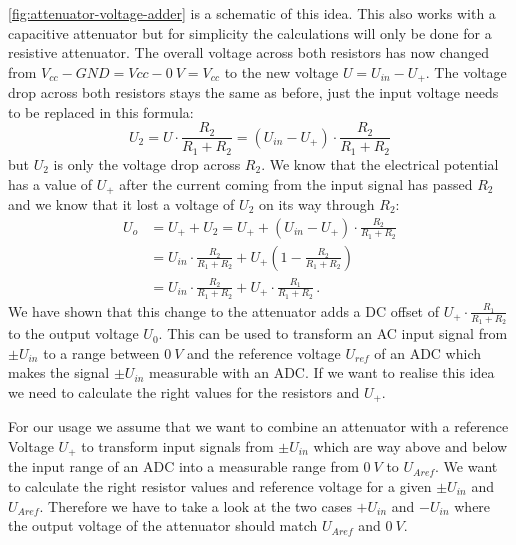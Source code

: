 \cref{fig:attenuator-voltage-adder} is a schematic of this idea. This also works with a capacitive attenuator but for simplicity the calculations will only be done for a resistive attenuator. The overall voltage across both resistors has now changed from $V_{cc} - GND = V{cc} - \SI{0}{V} = V_{cc}$ to the new voltage $U = U_{in} - U_+$. The voltage drop across both resistors stays the same as before, just the input voltage needs to be replaced in this formula:
\begin{equation*}
	U_2 = U \cdot \frac{R_2}{R_1 + R_2} = (U_{in} - U_+) \cdot \frac{R_2}{R_1 + R_2}
\end{equation*}
but $U_2$ is only the voltage drop across $R_2$. We know that the electrical potential has a value of $U_+$ after the current coming from the input signal has passed $R_2$ and we know that it lost a voltage of $U_2$ on its way through $R_2$:
\begin{align*}
	U_o &= U_+ + U_2 = U_+ + (U_{in} - U_+) \cdot \frac{R_2}{R_1 + R_2} \\
		&= U_{in} \cdot \frac{R_2}{R_1 + R_2} + U_+ \left(1 - \frac{R_2}{R_1 + R_2}\right) \\
		&= U_{in} \cdot \frac{R_2}{R_1 + R_2} + U_+ \cdot \frac{R_1}{R_1 + R_2}\,.
\end{align*}
We have shown that this change to the attenuator adds a DC offset of $U_+ \cdot \frac{R_1}{R_1 + R_2}$ to the output voltage $U_0$. This can be used to transform an AC input signal from $\pm U_{in}$ to a range between $\SI{0}{V}$ and the reference voltage $U_{ref}$ of an ADC which makes the signal $\pm U_{in}$ measurable with an ADC. If we want to realise this idea we need to calculate the right values for the resistors and $U_+$.

For our usage we assume that we want to combine an attenuator with a reference Voltage $U_+$ to transform input signals from $\pm{}U_{in}$ which are way above and below the input range of an ADC into a measurable range from $\SI{0}{V}$ to $U_{Aref}$. We want to calculate the right resistor values and reference voltage for a given $\pm{}U_{in}$ and $U_{Aref}$. Therefore we have to take a look at the two cases $+U_{in}$ and $-U_{in}$ where the output voltage of the attenuator should match $U_{Aref}$ and $\SI{0}{V}$.

